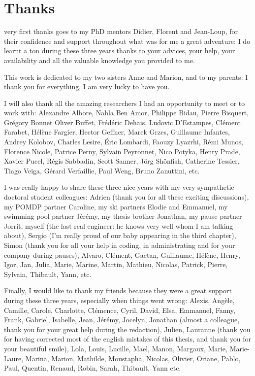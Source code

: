 \chapter*{Thanks}

 very first thanks goes to my PhD mentors Didier, Florent and Jean-Loup,
for their confidence and support throughout what was for me a great adventure:
I do learnt a ton during these three years thanks to your advices, your help, 
your availability and all the valuable knowledge you provided to me.

This work is dedicated to my two sisters Anne and Marion, and to my parents: 
I thank you for everything, I am very lucky to have you.

I will also thank all the amazing researchers 
I had an opportunity to meet or to work with:
Alexandre Albore,
Nahla Ben Amor,
Philippe Bidau, 
Pierre Bisquert,
Gr\'egory Bonnet
Oliver Buffet,
Fr\'ed\'eric Dehais,
Ludovic D'Estampes,
Cl\'ement Farabet,
H\'el\`ene Fargier, 
Hector Geffner,
Marek Grzes, 
Guillaume Infantes,
Andrey Kolobov,
Charles Lesire,
\'Eric Lombardi,
Faouzy Lyazrhi,
R\'emi Munos,
Florence Nicole,
Patrice Perny,
Sylvain Peyronnet,
Nico Potyka,
Henry Prade,
Xavier Pucel,
R\'egis Sabbadin, 
Scott Sanner,
J\"org Sh\"onfish,
Catherine Tessier,
Tiago Veiga,
G\'erard Verfaillie,
Paul Weng,
Bruno Zanuttini, etc.

I was really happy to share these three nice years with
my very sympathetic doctoral student colleagues: 
Adrien (thank you for all these exciting discussions), 
my POMDP partner Caroline,
my ski partners Elodie and Emmanuel,
my swimming pool partner J\'er\'emy, 
my thesis brother Jonathan, 
my pause partner Jorrit, 
myself (the last real engineer: he knows very well whom I am talking about), 
Sergio (I'm really proud of our baby appearing in the third chapter),  
Simon (thank you for all your help in coding, in administrating and for your company during pauses), 
Alvaro, Cl\'ement, Gaetan, Guillaume, H\'el\`ene, Henry, Igor, Jan, Julia, Marie, Marine, Martin, Mathieu, Nicolas, Patrick, Pierre, Sylvain, Thibault, Yann, etc.

Finally, I would like to thank my friends because they were a great support during these three years,
especially when things went wrong: 
Alexis, Ang\`ele, Camille, Carole, Charlotte, Cl\'emence, Cyril, David, Elsa, Emmanuel, Fanny,
Frank, Gabriel, Isabelle, Jean, J\'er\'emy, Jocelyn, Jonathan (almost a colleague, thank you for your great help during the redaction), 
Julien, Lauranne (thank you for having corrected most of the english mistakes of this thesis, and thank you for your beautiful smile), 
Lola, Louis, Lucille, Mael, Manon, Margaux, Marie, Marie-Laure, Marina, Marion, Mathilde, Moustapha, Nicolas, Olivier, Oriane, 
Pablo, Paul, Quentin, Renaud, Robin, Sarah, Thibault, Yann etc.

